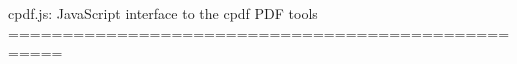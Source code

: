 cpdf.js: JavaScript interface to the cpdf PDF tools
===================================================
